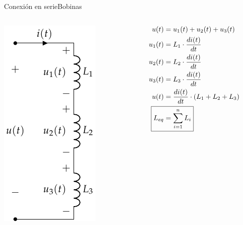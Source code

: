 \documentclass[aspectratio=169, xcolor={usenames,svgnames,dvipsnames}]{beamer}
\begin{document}
\begin{frame}{Conexión en serie}{Bobinas}
\begin{columns}
\begin{column}{0.3\columnwidth}
\begin{center}
\includegraphics[height=0.85\textheight]{../figs/BobinasSerie.pdf}
\end{center}
\end{column}
\begin{column}{0.7\columnwidth}
\begin{align*}
  u(t) & = u_1(t) + u_2(t) + u_3(t)\\
  u_1(t) &= L_1 \cdot \frac{di(t)}{dt}\\
  u_2(t) &= L_2 \cdot \frac{di(t)}{dt}\\
  u_3(t) &= L_3 \cdot \frac{di(t)}{dt}\\
  u(t)& = \frac{di(t)}{dt} \cdot (L_1 + L_2 + L_3)\\
  \Aboxed{L_{eq} &= \sum_{i = 1}^n L_i}
\end{align*}
\end{column}
\end{columns}
\end{frame}
\end{document}
